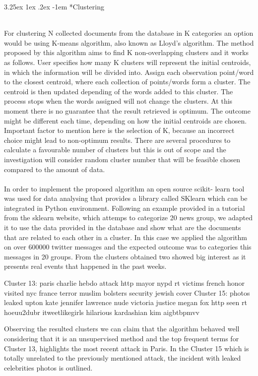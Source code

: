 \documentclass[12pt]{article}
\makeatletter
\renewcommand\paragraph{\@startsection{paragraph}{5}{\z@}%
  {3.25ex \@plus1ex \@minus.2ex}%
  {-1em}%
  {\normalfont\normalsize\bfseries}}
\makeatother
\begin{document}
\paragraph*{Clustering}
\hfill \break 
\\
For clustering N collected documents from the database in K categories an option would be using K-means\cite{k-means} algorithm, also known as Lloyd's algorithm. The method\cite{k-means-example} proposed by this algorithm aims to find K non-overlapping clusters and it works as follows. User specifies how many K clusters will represent the initial centroids, in which the information will be divided into. Assign each observation point/word to the closest centroid, where each collection of points/words form a cluster. The centroid is then updated depending of the words added to this cluster. The process stops when the words assigned will not change the clusters. At this moment there is no guarantee that the result retrieved is optimum. The outcome might be different each time, depending on how the initial centroids are chosen. Important factor to mention here is the selection of K, because an incorrect choice might lead to non-optimum results. There are several procedures\cite{procedures-for-kmeans} to calculate a favourable number of clusters but this is out of scope and the investigation will consider random cluster number that will be feasible chosen compared to the amount of data.
\\
\\
In order to implement the proposed algorithm an open  source scikit- learn \cite{sklearn} tool was used for data analysing that provides a library called SKlearn which can be integrated in Python environment. Following an example provided in a tutorial from the sklearn website, which attemps to categorize 20 news group\cite{k-means-20news}, we adapted it to use the data provided in the database and show what are the documents that are related to each other in a cluster.  In this case we applied the algorithm on over 600000 twitter messages and the expected outcome was to categories this messages in 20 groups. From the clusters obtained two showed big interest as it presents real events that happened in the past weeks.
\begin{spverbatim}
Cluster 13:  paris  charlie  hebdo  attack  http  mayor  nypd  
rt  victims  french  honor  visited  nyc  france  terror  muslim 
 bolsters  security  jewish  cover
Cluster 15:  photos  leaked  upton  kate  jennifer  lawrence 
 nude  victoria  justice  megan  fox  http  seen  rt  hoeuu2dubr  
itweetlikegirls  hilarious  kardashian  kim  aigbtbpmvv
\end{spverbatim}
\hfill \break
Observing the resulted clusters we can claim that the algorithm behaved well considering that it is an unsupervised method and the top frequent terms for Cluster 13, highlights the most recent attack in Paris. In the Cluster 15 which is totally unrelated to the previously mentioned attack, the incident with leaked celebrities photos is outlined.
\end{document}
